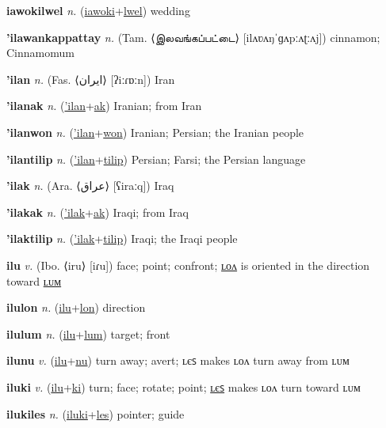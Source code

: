 \textbf{\hypertarget{iawokilwel}{iawokilwel}} \textit{n.} (\hyperlink{iawoki}{iawoki}+\allowbreak \hyperlink{lwel}{lwel})
wedding

\textbf{\hypertarget{'ilawankappattay}{'ilawankappattay}} \textit{n.} (Tam. ⟨{\tamil{}இலவங்கப்பட்டை}⟩ [ilʌʋʌŋˈɡʌpːʌʈːʌj])
cinnamon; Cinnamomum

\textbf{\hypertarget{'ilan}{'ilan}} \textit{n.} (Fas. ⟨{\arabics{}ایران‎}⟩ [ʔiːɾɒːn])
Iran

\textbf{\hypertarget{'ilanak}{'ilanak}} \textit{n.} (\hyperlink{'ilan}{'ilan}+\allowbreak \hyperlink{ak}{ak})
Iranian; from Iran

\textbf{\hypertarget{'ilanwon}{'ilanwon}} \textit{n.} (\hyperlink{'ilan}{'ilan}+\allowbreak \hyperlink{won}{won})
Iranian; Persian; the Iranian people

\textbf{\hypertarget{'ilantilip}{'ilantilip}} \textit{n.} (\hyperlink{'ilan}{'ilan}+\allowbreak \hyperlink{tilip}{tilip})
Persian; Farsi; the Persian language

\textbf{\hypertarget{'ilak}{'ilak}} \textit{n.} (Ara. ⟨{\arabics{}عراق}⟩ [ʕiraːq])
Iraq

\textbf{\hypertarget{'ilakak}{'ilakak}} \textit{n.} (\hyperlink{'ilak}{'ilak}+\allowbreak \hyperlink{ak}{ak})
Iraqi; from Iraq

\textbf{\hypertarget{'ilaktilip}{'ilaktilip}} \textit{n.} (\hyperlink{'ilak}{'ilak}+\allowbreak \hyperlink{tilip}{tilip})
Iraqi; the Iraqi people

\textbf{\hypertarget{ilu}{ilu}} \textit{v.} (Ibo. ⟨iru⟩ [iɾu])
face; point; confront; \hyperlink{ilulon}{ʟᴏᴧ} is oriented in the direction toward \hyperlink{ilulum}{ʟᴜᴍ}

\textbf{\hypertarget{ilulon}{ilulon}} \textit{n.} (\hyperlink{ilu}{ilu}+\allowbreak \hyperlink{lon}{lon})
direction

\textbf{\hypertarget{ilulum}{ilulum}} \textit{n.} (\hyperlink{ilu}{ilu}+\allowbreak \hyperlink{lum}{lum})
target; front

\textbf{\hypertarget{ilunu}{ilunu}} \textit{v.} (\hyperlink{ilu}{ilu}+\allowbreak \hyperlink{nu}{nu})
turn away; avert; ʟєꜱ makes ʟᴏᴧ turn away from ʟᴜᴍ

\textbf{\hypertarget{iluki}{iluki}} \textit{v.} (\hyperlink{ilu}{ilu}+\allowbreak \hyperlink{ki}{ki})
turn; face; rotate; point; \hyperlink{ilukiles}{ʟєꜱ} makes ʟᴏᴧ turn toward ʟᴜᴍ

\textbf{\hypertarget{ilukiles}{ilukiles}} \textit{n.} (\hyperlink{iluki}{iluki}+\allowbreak \hyperlink{les}{les})
pointer; guide

